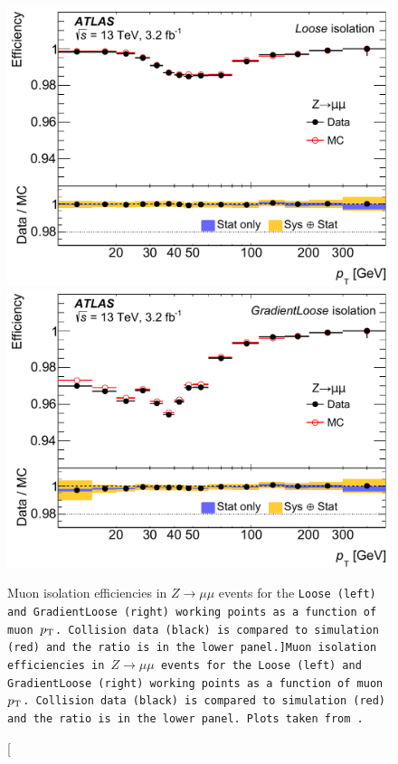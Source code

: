 \begin{figure}[htbp]
  \centering
  \includegraphics[width=.48\textwidth]{figs/detector/muon_iso_efficiency_loose-cropped}
  \includegraphics[width=.48\textwidth]{figs/detector/muon_iso_efficiency_gloose-cropped}
  \caption[Muon isolation efficiencies in $Z\rightarrow\mu\mu$ events for the \tt{Loose} (left) and \tt{GradientLoose} (right) working points as a function of muon $p_{\mathrm{T}}$.  Collision data (black) is compared to simulation (red) and the ratio is in the lower panel.]{Muon isolation efficiencies in $Z\rightarrow\mu\mu$ events for the \tt{Loose} (left) and \tt{GradientLoose} (right) working points as a function of muon $p_{\mathrm{T}}$.  Collision data (black) is compared to simulation (red) and the ratio is in the lower panel.  Plots taken from~\cite{2016.muon-reconstruction-13tev}.}
  \label{fig:muon_iso_efficiency}
\end{figure}

